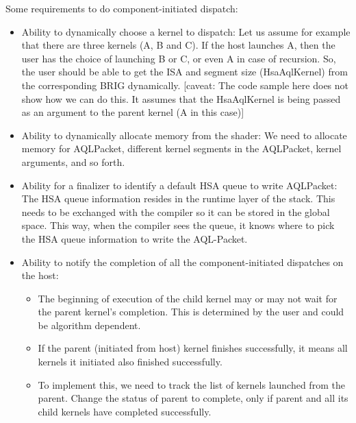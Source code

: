 \documentclass[final]{book}
\begin{document}
Some requirements to do component-initiated dispatch:
\begin{itemize}
\item Ability to dynamically choose a kernel to dispatch: Let us assume for
  example that there are three kernels (A, B and C). If the host launches A,
  then the user has the choice of launching B or C, or even A in case of
  recursion. So, the user should be able to get the ISA and segment size
  (Hsa\-Aql\-Kernel) from the corresponding BRIG dynamically. \mbox{[}caveat:
  The code sample here does not show how we can do this. It assumes that the
  Hsa\-Aql\-Kernel is being passed as an argument to the parent kernel (A in
  this case)\mbox{]}

\item Ability to dynamically allocate memory from the shader: We need to
  allocate memory for AQL\-Packet, different kernel segments in the AQL\-Packet,
  kernel arguments, and so forth.

\item Ability for a finalizer to identify a default HSA queue to write
  AQL\-Packet: The HSA queue information resides in the runtime layer of the
  stack. This needs to be exchanged with the compiler so it can be stored in the
  global space. This way, when the compiler sees the queue, it knows where to
  pick the HSA queue information to write the AQL-Packet.

\item Ability to notify the completion of all the component-initiated
  dispatches on the host:

\begin{itemize}
\item The beginning of execution of the child kernel may or may not wait for the
  parent kernel's completion. This is determined by the user and could be
  algorithm dependent.
\item If the parent (initiated from host) kernel finishes successfully, it means
  all kernels it initiated also finished successfully.
\item To implement this, we need to track the list of kernels launched from the
  parent. Change the status of parent to complete, only if parent and all its
  child kernels have completed successfully.
\end{itemize}
\end{itemize}
\end{document}
